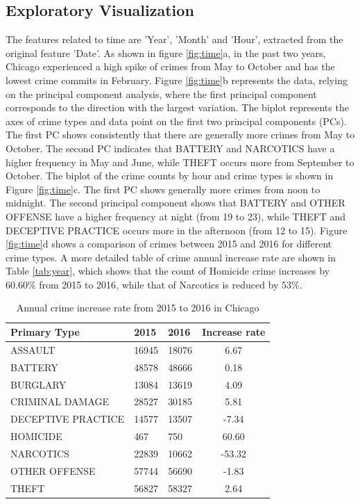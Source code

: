 \documentclass[12pt]{article}
\begin{document}
\subsection{Exploratory Visualization}
The features related to time are 'Year', 'Month' and 'Hour', extracted from the original feature 'Date'. As shown in figure \ref{fig:time}a, in the past two years, Chicago experienced a high spike of crimes from May to October and has the lowest crime commits in February. Figure \ref{fig:time}b represents the data, relying on the principal component analysis, where the first principal component corresponds to the direction with the largest variation. The biplot represents the axes of crime types and data point on the first two principal components (PCs). The first PC shows consistently that there are generally more crimes from May to October. The second PC indicates that BATTERY and NARCOTICS have a higher frequency in May and June, while THEFT occurs more from September to October. The biplot of the crime counts by hour and crime types is shown in Figure \ref{fig:time}c. The first PC shows generally more crimes from noon to midnight. The second principal component shows that BATTERY and OTHER OFFENSE have a higher frequency at night (from 19 to 23), while THEFT and DECEPTIVE PRACTICE occurs more in the afternoon (from 12 to 15). Figure \ref{fig:time}d shows a comparison of crimes between 2015 and 2016 for different crime types. A more detailed table of crime annual increase rate are shown in Table \ref{tab:year}, which shows that the count of Homicide crime increases by $60.60\%$ from 2015 to 2016, while that of Narcotics is reduced by $53\%$.  

\begin{table}
\caption{Annual crime increase rate from 2015 to 2016 in Chicago} 
\label{
year} 
\begin{center}
\begin{tabular}{l|p{2.5cm}|p{2.5cm}|c}
\hline
\textbf{Primary Type}&	\textbf{2015}&	\textbf{2016}	&	\textbf{Increase rate}\\
\hline		
ASSAULT&			16945&	18076&	6.67\\
BATTERY&			48578&	48666&	0.18\\
BURGLARY&		13084&	13619&	4.09\\
CRIMINAL DAMAGE&	28527&	30185&	5.81\\
DECEPTIVE PRACTICE&	14577&	13507&	-7.34\\
HOMICIDE&		467&		750&		60.60\\
NARCOTICS&		22839&	10662&	-53.32\\
OTHER OFFENSE&	57744&	56690&	-1.83\\
THEFT&			56827&	58327&	2.64\\
\hline
\end{tabular}
\end{center}
\end{table}
\end{document}

